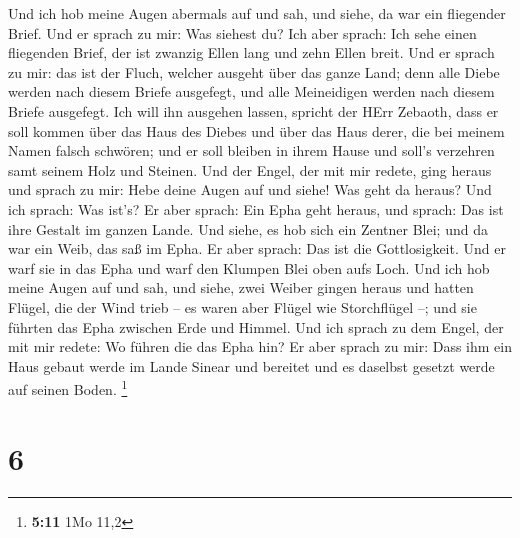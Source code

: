  Und ich hob meine Augen abermals auf und sah, und siehe,
da war ein fliegender Brief.  Und er sprach zu mir: Was
siehest du? Ich aber sprach: Ich sehe einen fliegenden Brief, der ist
zwanzig Ellen lang und zehn Ellen breit.  Und er sprach zu
mir: das ist der Fluch, welcher ausgeht über das ganze Land; denn alle
Diebe werden nach diesem Briefe ausgefegt, und alle Meineidigen werden
nach diesem Briefe ausgefegt.  Ich will ihn ausgehen
lassen, spricht der HErr Zebaoth, dass er soll kommen über das Haus des
Diebes und über das Haus derer, die bei meinem Namen falsch schwören;
und er soll bleiben in ihrem Hause und soll's verzehren samt seinem Holz
und Steinen.  Und der Engel, der mit mir redete, ging
heraus und sprach zu mir: Hebe deine Augen auf und siehe! Was geht da
heraus?  Und ich sprach: Was ist's? Er aber sprach: Ein
Epha geht heraus, und sprach: Das ist ihre Gestalt im ganzen Lande.
 Und siehe, es hob sich ein Zentner Blei; und da war ein
Weib, das saß im Epha.  Er aber sprach: Das ist die
Gottlosigkeit. Und er warf sie in das Epha und warf den Klumpen Blei
oben aufs Loch.  Und ich hob meine Augen auf und sah, und
siehe, zwei Weiber gingen heraus und hatten Flügel, die der Wind trieb
-- es waren aber Flügel wie Storchflügel --; und sie führten das Epha
zwischen Erde und Himmel.  Und ich sprach zu dem Engel,
der mit mir redete: Wo führen die das Epha hin?  Er aber
sprach zu mir: Dass ihm ein Haus gebaut werde im Lande Sinear und
bereitet und es daselbst gesetzt werde auf seinen Boden. \footnote{\textbf{5:11}
  1Mo 11,2}

\hypertarget{section-5}{%
\section{6}\label{section-5}}


